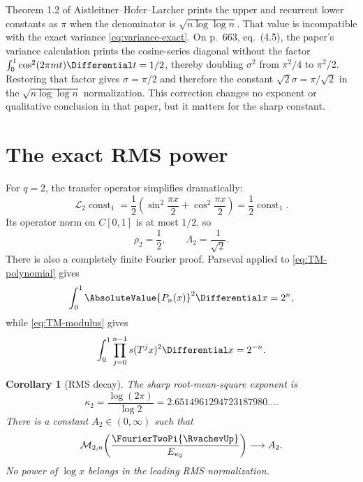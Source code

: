 \documentclass[11pt,oneside]{article}
\numberwithin{equation}{section}
\newtheorem{corollary}[theorem]{Corollary}
\theoremstyle{definition}
\theoremstyle{remark}
\newcommand{\ConstantOneFunction}{\operatorname{const}_{1}}
\begin{document}
Theorem 1.2 of Aistleitner--Hofer--Larcher \cite{ahl2017} prints the upper and recurrent
lower constants as $\pi$ when the denominator is $\sqrt{n\log\log n}$.  That value is
incompatible with the exact variance \eqref{eq:variance-exact}.  On p.~663,
eq.~(4.5), the paper's variance calculation prints the cosine-series diagonal without the
factor
$\int_0^1\cos^2(2\pi mt)\Differential t=1/2$, thereby doubling $\sigma^2$ from
$\pi^2/4$ to $\pi^2/2$.  Restoring that factor gives
$\sigma=\pi/2$ and therefore the constant $\sqrt2\sigma=\pi/\sqrt2$ in the
$\sqrt{n\log\log n}$ normalization.  This correction changes no exponent or qualitative
conclusion in that paper, but it matters for the sharp constant.

\section{The exact RMS power}
\label{sec:RMS}

For $q=2$, the transfer operator simplifies dramatically:
\begin{equation}
 \mathcal L_2\ConstantOneFunction
 =\frac12\left(\sin^2\frac{\pi x}{2}+\cos^2\frac{\pi x}{2}\right)
 =\frac12\ConstantOneFunction.
 \label{eq:L2-one}
\end{equation}
Its operator norm on $C[0,1]$ is at most $1/2$, so
\begin{equation}
 \rho_2=\frac12,
 \qquad
 \Lambda_2=\frac1{\sqrt2}.
 \label{eq:rho2}
\end{equation}
There is also a completely finite Fourier proof.  Parseval applied to
\eqref{eq:TM-polynomial} gives
\[
 \int_0^1\AbsoluteValue{P_n(x)}^2\Differential x=2^n,
\]
while \eqref{eq:TM-modulus} gives
\begin{equation}
 \int_0^1\prod_{j=0}^{n-1}s(T^jx)^2\Differential x=2^{-n}.
 \label{eq:exact-L2-product}
\end{equation}

\begin{corollary}[RMS decay]
\label{cor:RMS-decay}
The sharp root-mean-square exponent is
\begin{equation}
 \boxed{\displaystyle
 \kappa_2=\frac{\log(2\pi)}{\log2}
 =2.6514961294723187980\ldots .}
 \label{eq:kappa2}
\end{equation}
There is a constant $A_2\in(0,\infty)$ such that
\begin{equation}
 \mathcal M_{2,n}\!\left(\frac{\FourierTwoPi{\RvachevUp}}{E_{\kappa_2}}\right)
 \longrightarrow A_2.
 \label{eq:RMS-limit}
\end{equation}
No power of $\log x$ belongs in the leading RMS normalization.
\end{corollary}
\end{document}
